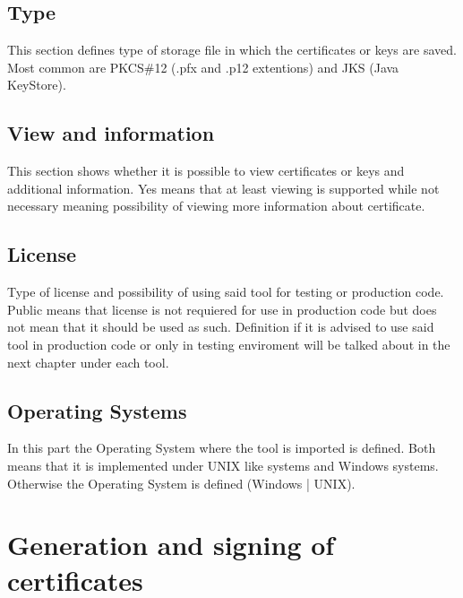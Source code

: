 \documentclass[10pt, a4paper]{report}
\begin{document}
\subsection{Type}
This section defines type of storage file in which the certificates or keys are saved. Most common are PKCS\#12 (.pfx and .p12 extentions) and JKS (Java KeyStore). 

\subsection{View and information}
This section shows whether it is possible to view certificates or keys and additional information. Yes means that at least viewing is supported while not necessary meaning possibility of viewing more information about certificate.

\subsection{License}
Type of license and possibility of using said tool for testing or production code. Public means that license is not requiered for use in production code but does not mean that it should be used as such. Definition if it is advised to use said tool in production code or only in testing enviroment will be talked about in the next chapter under each tool.

\subsection{Operating Systems}
In this part the Operating System where the tool is imported is defined. Both means that it is implemented under UNIX like systems and Windows systems. Otherwise the Operating System is defined (Windows | UNIX).

\newpage

\section{Generation and signing of certificates}
\end{document}
